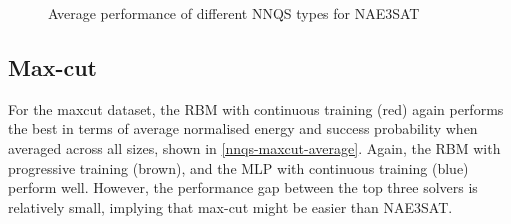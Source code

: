 \begin{figure}[!htb]
    \centering
    \caption{Average performance of different NNQS types for NAE3SAT}
    \label{nnqs-nae3sat-average}
\end{figure}

\subsection{Max-cut}
For the maxcut dataset, the RBM with continuous training (red) again performs the best in terms of average normalised energy and success probability when averaged across all sizes, shown in \autoref{nnqs-maxcut-average}. Again, the RBM with progressive training (brown), and the MLP with continuous training (blue) perform well. However, the performance gap between the top three solvers is relatively small, implying that max-cut might be easier than NAE3SAT.

